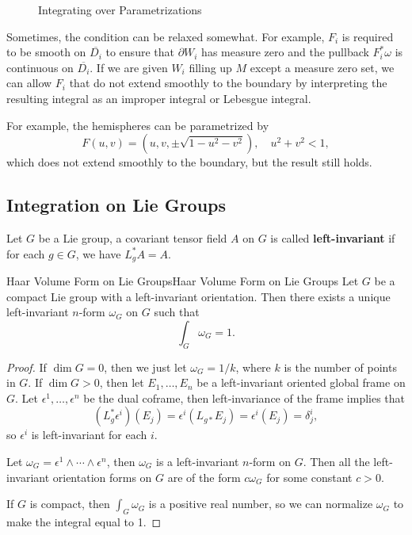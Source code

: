 \documentclass[../main.tex]{subfiles}
\begin{document}
\begin{figure}[ht]
    \centering
    \caption{Integrating over Parametrizations}
    \label{fig:integrating-over-parametrizations}
\end{figure}

\begin{remark}
  Sometimes, the condition can be relaxed somewhat. For example, $F_i$ is required to be smooth on $\overline{D_i}$ to ensure that $\partial W_i$ has measure zero and the pullback $F_i^*\omega$ is continuous on $\overline{D_i}$. If we are given $W_i$ filling up $M$ except a measure zero set, we can allow $F_i$ that do not extend smoothly to the boundary by interpreting the resulting integral as an improper integral or Lebesgue integral.

  For example, the hemispheres can be parametrized by
  \begin{equation*}
    F(u,v) = (u,v,\pm\sqrt{1-u^2-v^2}), \quad u^2+v^2 < 1,
  \end{equation*}
  which does not extend smoothly to the boundary, but the result still holds.
\end{remark}

\subsection{Integration on Lie Groups}
Let $G$ be a Lie group, a covariant tensor field $A$ on $G$ is called \textbf{left-invariant} if for each $g\in G$, we have $L_g^* A = A$.

\begin{theorem}{Haar Volume Form on Lie Groups}{Haar Volume Form on Lie Groups}
  Let $G$ be a compact Lie group with a left-invariant orientation. Then there exists a unique left-invariant $n$-form $\omega_G$ on $G$ such that
  \begin{equation*}
    \int_G \omega_G = 1.
  \end{equation*}
\end{theorem}
\begin{proof}
  If $\dim G = 0$, then we just let $\omega_G = 1 / k$, where $k$ is the number of points in $G$. If $\dim G > 0$, then let $E_1, \ldots , E_n$ be a left-invariant oriented global frame on $G$. Let $\epsilon^1, \ldots , \epsilon^n$ be the dual coframe, then left-invariance of the frame implies that
  \begin{equation*}
    (L_g^* \epsilon^i)(E_j) = \epsilon^i(L_{g*} E_j) = \epsilon^i(E_j) = \delta^i_j,
  \end{equation*}
  so $\epsilon^i$ is left-invariant for each $i$.

  Let $\omega_G = \epsilon^1 \wedge \cdots \wedge \epsilon^n$, then $\omega_G$ is a left-invariant $n$-form on $G$. Then all the left-invariant orientation forms on $G$ are of the form $c\omega_G$ for some constant $c >0$.

  If $G$ is compact, then $\int_G \omega_G$ is a positive real number, so we can normalize $\omega_G$ to make the integral equal to 1.
\end{proof}
\end{document}

